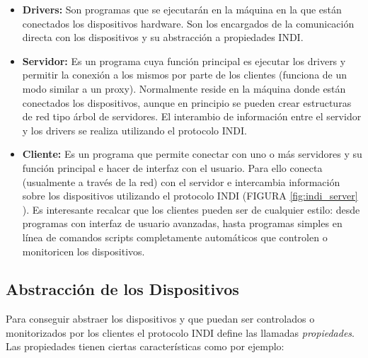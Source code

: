 \begin{itemize}
  \item \textbf{Drivers:} Son programas que se ejecutarán en la máquina en la que están conectados los dispositivos hardware. Son los encargados de la comunicación directa con los dispositivos y su abstracción a propiedades INDI.
  
  \item \textbf{Servidor:} Es un programa cuya función principal es ejecutar los drivers y permitir la conexión a los mismos por parte de los clientes (funciona de un modo similar a un proxy). Normalmente reside en la máquina donde están conectados los dispositivos, aunque en principio se pueden crear estructuras de red tipo árbol de servidores. El interambio de información entre el servidor y los drivers se realiza utilizando el protocolo INDI.
  
  \item \textbf{Cliente:} Es un programa que permite conectar con uno o más servidores y su función principal e hacer de interfaz con el usuario. Para ello conecta (usualmente a través de la red) con el servidor e intercambia información sobre los dispositivos utilizando el protocolo INDI (FIGURA \ref{fig:indi_server} ). Es interesante recalcar que los clientes pueden ser de cualquier estilo: desde programas con interfaz de usuario avanzadas, hasta programas simples en línea de comandos scripts completamente automáticos que controlen o monitoricen los dispositivos.
\end{itemize}


\subsection{Abstracción de los Dispositivos}

Para conseguir abstraer los dispositivos y que puedan ser controlados o monitorizados por los clientes el protocolo INDI define las llamadas \textit{propiedades}. Las propiedades tienen ciertas características como por ejemplo:

